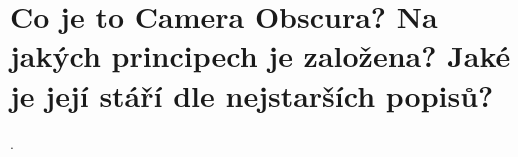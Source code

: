 \section{Co je to Camera Obscura? Na jakých principech je založena? Jaké je její stáří dle nejstarších popisů?}.